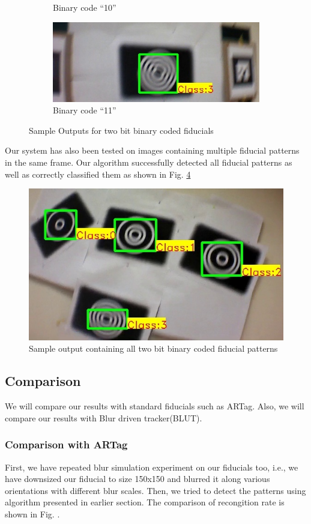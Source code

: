 \documentclass[runningheads]{llncs}
\begin{document}
\begin{figure}
\begin{subfigure}{0.5\textwidth}
  \caption{Binary code ``10''}
  \label{fig:output2}
\end{subfigure}
\begin{subfigure}{0.5\textwidth}
\centering
  \includegraphics[width=\linewidth]{output_11.jpg}
  \caption{Binary code ``11''}
  \label{fig:output3}
  \end{subfigure}
  \caption{Sample Outputs for two bit binary coded fiducials}
\end{figure}

Our system has also been tested on images containing multiple fiducial patterns
in the same frame. Our algorithm successfully detected all fiducial patterns as
well as correctly classified them as shown in Fig. \ref{fig:output_all}
\begin{figure}
\centering
  \includegraphics[width=.8\linewidth]{output_all_2.jpg}
  \caption{Sample output containing all two bit binary coded fiducial patterns}
  \label{fig:output_all}
\end{figure}

\subsection{Comparison}
We will compare our results with standard fiducials such as ARTag. Also, we will
compare our results with Blur driven tracker(BLUT)\cite{Wu:2011}.
\subsubsection{Comparison with ARTag}
First, we have repeated blur simulation experiment on our fiducials too, i.e.,
we have downsized our fiducial to size 150x150 and blurred it along various
orientations with different blur scales. Then, we tried to detect the patterns
using algorithm presented in earlier section. The comparison of recongition
rate is shown in Fig. \label{fig:recognition_rate}. 
\end{document}
